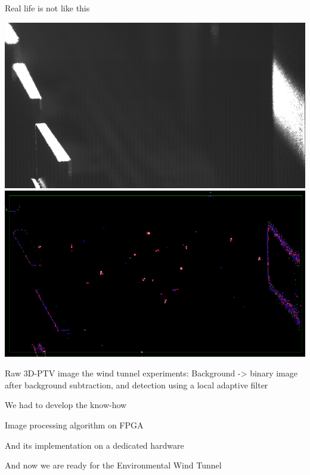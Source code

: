 \documentclass[aspectratio=43]{beamer}
\begin{document}
\begin{frame}{Real life is not like this}
\begin{multicols}{2}
\includegraphics[width=.49\textwidth]{background.png}
\includegraphics[width=.49\textwidth]{detection.png}
\end{multicols}
\begin{cardTiny}
Raw 3D-PTV image the wind tunnel experiments: Background ->  binary image after background subtraction, and detection using a local adaptive filter
\end{cardTiny}
\end{frame}

\begin{frame}{We had to develop the know-how}
\centering{}
\end{frame}


\begin{frame}{Image processing algorithm on FPGA}
\centering{}
\end{frame}

\begin{frame}{And its implementation on a dedicated hardware}
\begin{multicols}{2}
\centering
{}
\end{multicols}
\end{frame}


\begin{frame}{And now we are ready for the Environmental Wind Tunnel}
\end{frame}
\end{document}

